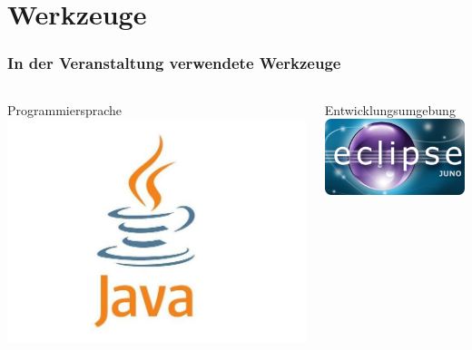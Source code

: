 \section{Werkzeuge}
\begin{frame}
\frametitle{In der Veranstaltung verwendete Werkzeuge}
	\begin{columns}[T]
	    \begin{column}{.3\textwidth}
	    	\begin{block}{Programmiersprache}
	    		\center
	    		\includegraphics[width=1\textwidth, keepaspectratio=true]{bilder/java.jpeg}
	    	\end{block}
	    \end{column}
	    \begin{column}{.3\textwidth}
	     	\begin{block}{Entwicklungsumgebung}
	     		\center
	     		\includegraphics[width=1\textwidth, keepaspectratio=true]{bilder/eclipse.jpg}

\end{block}
\end{column}
\end{columns}
\end{frame}
